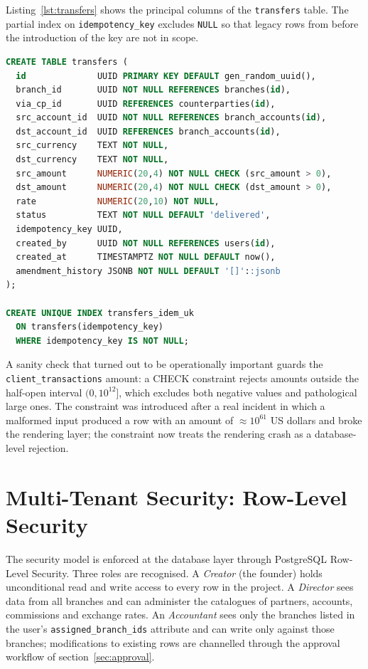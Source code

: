 Listing~\ref{lst:transfers} shows the principal columns of the \texttt{transfers} table. The partial index on \texttt{idempotency\_key} excludes \texttt{NULL} so that legacy rows from before the introduction of the key are not in scope.

\begin{lstlisting}[language=SQL,caption={The \texttt{transfers} table (principal columns)},label={lst:transfers}]
CREATE TABLE transfers (
  id              UUID PRIMARY KEY DEFAULT gen_random_uuid(),
  branch_id       UUID NOT NULL REFERENCES branches(id),
  via_cp_id       UUID REFERENCES counterparties(id),
  src_account_id  UUID NOT NULL REFERENCES branch_accounts(id),
  dst_account_id  UUID REFERENCES branch_accounts(id),
  src_currency    TEXT NOT NULL,
  dst_currency    TEXT NOT NULL,
  src_amount      NUMERIC(20,4) NOT NULL CHECK (src_amount > 0),
  dst_amount      NUMERIC(20,4) NOT NULL CHECK (dst_amount > 0),
  rate            NUMERIC(20,10) NOT NULL,
  status          TEXT NOT NULL DEFAULT 'delivered',
  idempotency_key UUID,
  created_by      UUID NOT NULL REFERENCES users(id),
  created_at      TIMESTAMPTZ NOT NULL DEFAULT now(),
  amendment_history JSONB NOT NULL DEFAULT '[]'::jsonb
);

CREATE UNIQUE INDEX transfers_idem_uk
  ON transfers(idempotency_key)
  WHERE idempotency_key IS NOT NULL;
\end{lstlisting}

A sanity check that turned out to be operationally important guards the \texttt{client\_transactions} amount: a CHECK constraint rejects amounts outside the half-open interval $(0, 10^{12}]$, which excludes both negative values and pathological large ones. The constraint was introduced after a real incident in which a malformed input produced a row with an amount of $\approx 10^{61}$ US dollars and broke the rendering layer; the constraint now treats the rendering crash as a database-level rejection.

\section{Multi-Tenant Security: Row-Level Security}
\label{sec:rls}

The security model is enforced at the database layer through PostgreSQL Row-Level Security. Three roles are recognised. A \emph{Creator} (the founder) holds unconditional read and write access to every row in the project. A \emph{Director} sees data from all branches and can administer the catalogues of partners, accounts, commissions and exchange rates. An \emph{Accountant} sees only the branches listed in the user's \texttt{assigned\_branch\_ids} attribute and can write only against those branches; modifications to existing rows are channelled through the approval workflow of section~\ref{sec:approval}.

